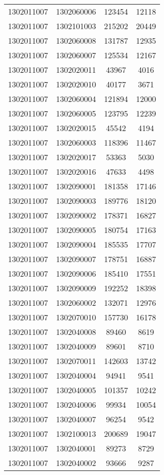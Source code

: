 \begin{longtable}{llcc}
1302011007 & 1302060006 & 123454 & 12118\\
1302011007 & 1302101003 & 215202 & 20449\\
1302011007 & 1302060008 & 131787 & 12935\\
1302011007 & 1302060007 & 125534 & 12167\\
1302011007 & 1302020011 & 43967 & 4016\\
1302011007 & 1302020010 & 40177 & 3671\\
1302011007 & 1302060004 & 121894 & 12000\\
1302011007 & 1302060005 & 123795 & 12239\\
1302011007 & 1302020015 & 45542 & 4194\\
1302011007 & 1302060003 & 118396 & 11467\\
1302011007 & 1302020017 & 53363 & 5030\\
1302011007 & 1302020016 & 47633 & 4498\\
1302011007 & 1302090001 & 181358 & 17146\\
1302011007 & 1302090003 & 189776 & 18120\\
1302011007 & 1302090002 & 178371 & 16827\\
1302011007 & 1302090005 & 180754 & 17163\\
1302011007 & 1302090004 & 185535 & 17707\\
1302011007 & 1302090007 & 178751 & 16887\\
1302011007 & 1302090006 & 185410 & 17551\\
1302011007 & 1302090009 & 192252 & 18398\\
1302011007 & 1302060002 & 132071 & 12976\\
1302011007 & 1302070010 & 157730 & 16178\\
1302011007 & 1302040008 & 89460 & 8619\\
1302011007 & 1302040009 & 89601 & 8710\\
1302011007 & 1302070011 & 142603 & 13742\\
1302011007 & 1302040004 & 94941 & 9541\\
1302011007 & 1302040005 & 101357 & 10242\\
1302011007 & 1302040006 & 99934 & 10054\\
1302011007 & 1302040007 & 96254 & 9542\\
1302011007 & 1302100013 & 200689 & 19047\\
1302011007 & 1302040001 & 89273 & 8729\\
1302011007 & 1302040002 & 93666 & 9287\\

\end{longtable}
